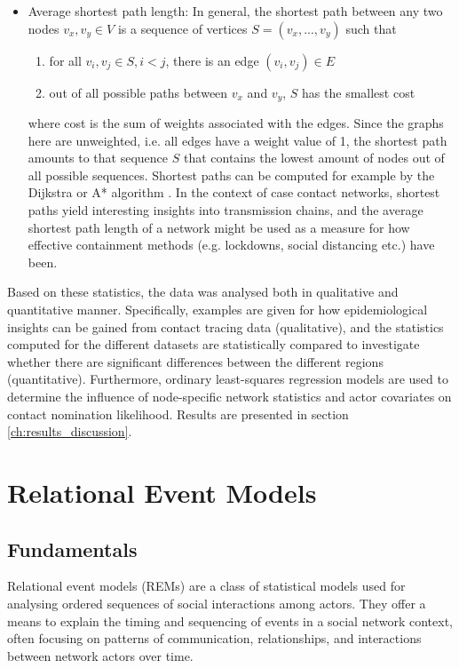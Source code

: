 \begin{itemize}
	\item Average shortest path length: In general, the shortest path between any two nodes $v_x,v_y \in V$ is a sequence of vertices $S = (v_x,...,v_y)$ such that 
	\begin{enumerate}
		\item for all $v_i,v_j \in S, i < j$, there is an edge $(v_i,v_j) \in E$
		\item out of all possible paths between $v_x$ and $v_y$, $S$ has the smallest cost
	\end{enumerate}
	where cost is the sum of weights associated with the edges. Since the graphs here are unweighted, i.e. all edges have a weight value of 1, the shortest path amounts to that sequence $S$ that contains the lowest amount of nodes out of all possible sequences. Shortest paths can be computed for example by the Dijkstra or A* algorithm . In the context of case contact networks, shortest paths yield interesting insights into transmission chains, and the average shortest path length of a network might be used as a measure for how effective containment methods (e.g. lockdowns, social distancing etc.) have been.
\end{itemize}  
\bigskip

\noindent Based on these statistics, the data was analysed both in qualitative and quantitative manner. Specifically, examples are given for how epidemiological insights can be gained from contact tracing data (qualitative), and the statistics computed for the different datasets are statistically compared to investigate whether there are significant differences between the different regions (quantitative). Furthermore, ordinary least-squares regression models are used to determine the influence of node-specific network statistics and actor covariates on contact nomination likelihood. Results are presented in section \ref{ch:results_discussion}.

\section{Relational Event Models}
\label{sec:rem}

\subsection{Fundamentals}
\label{sec:rem_fundamentals}

Relational event models (REMs) are a class of statistical models used for analysing ordered sequences of social interactions among actors. They offer a means to explain the timing and sequencing of events in a social network context, often focusing on patterns of communication, relationships, and interactions between network actors over time. 

